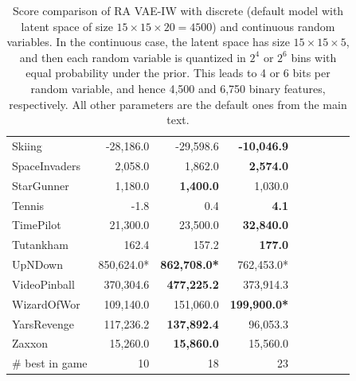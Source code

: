 \begin{table}
{\begin{tabular}{lrrrrrrrl}
Skiing         & -28,186.0            & -29,598.6            & \textbf{-10,046.9}   \\
SpaceInvaders  & 2,058.0              & 1,862.0              & \textbf{2,574.0}     \\
StarGunner     & 1,180.0              & \textbf{1,400.0}     & 1,030.0              \\
Tennis         & -1.8                 & 0.4                  & \textbf{4.1}         \\
TimePilot      & 21,300.0             & 23,500.0             & \textbf{32,840.0}    \\
Tutankham      & 162.4                & 157.2                & \textbf{177.0}       \\
UpNDown        & 850,624.0*            & \textbf{862,708.0*}   & 762,453.0*            \\
VideoPinball   & 370,304.6            & \textbf{477,225.2}   & 373,914.3            \\
WizardOfWor    & 109,140.0            & 151,060.0            & \textbf{199,900.0*}   \\
YarsRevenge    & 117,236.2            & \textbf{137,892.4}   & 96,053.3             \\
Zaxxon         & 15,260.0             & \textbf{15,860.0}    & 15,560.0             \\
\midrule

\# best in game & 10 & 18 & 23 \\
\bottomrule
\end{tabular}%
}
\caption{Score comparison of RA VAE-IW with discrete (default model with latent space of size $15 \times 15 \times 20 = 4500$) and continuous random variables. In the continuous case, the latent space has size $15 \times 15 \times 5$, and then each random variable is quantized in $2^4$ or $2^6$ bins with equal probability under the prior. This leads to 4 or 6 bits per random variable, and hence 4,500 and 6,750 binary features, respectively. All other parameters are the default ones from the main text.
} 
\label{tab:continuous}
\end{table}
